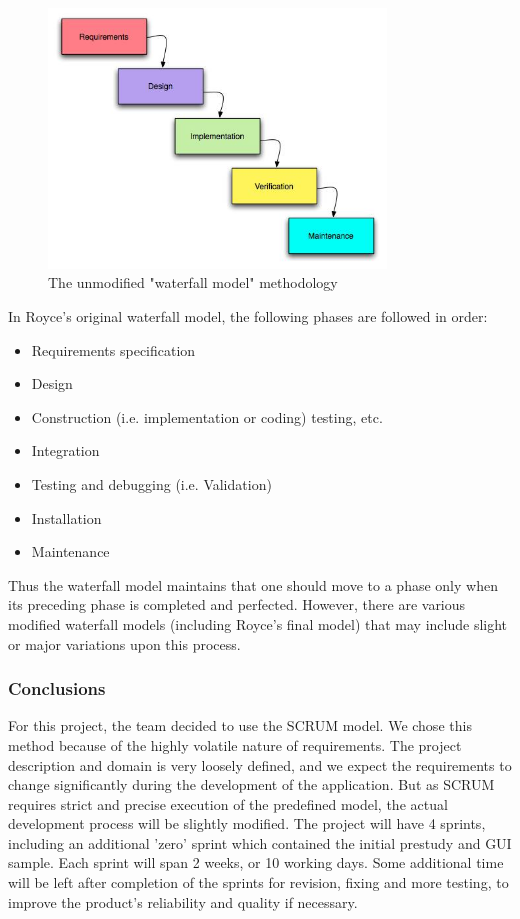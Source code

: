 \begin{figure}[htb]
	\centering
	\includegraphics[width=0.8\textwidth]{prestudy/development_process/waterfall.jpg}
	\caption{The unmodified "waterfall model" methodology\cite{worldpress:waterfall}}
	\label{fig:waterfall-model}
\end{figure}

In Royce's original waterfall model, the following phases are followed in order:

\begin{itemize}
	\item Requirements specification
	\item Design
	\item Construction (i.e. implementation or coding) testing, etc.
	\item Integration
	\item Testing and debugging (i.e. Validation)
	\item Installation
	\item Maintenance
\end{itemize}

Thus the waterfall model maintains that one should move to a phase only when its preceding phase is
completed and perfected. However, there are various modified waterfall models (including Royce's final model)
that may include slight or major variations upon this process.

\subsubsection{Conclusions}
For this project, the team decided to use the SCRUM model. We chose this method because of the highly volatile nature
of requirements. The project description and domain is very loosely defined,
and we expect the requirements to change significantly during the development
of the application. But as SCRUM requires strict and precise
execution of the predefined model, the actual development process will be slightly modified.
The project will have 4 sprints, including an additional 'zero' sprint which contained the initial
prestudy and GUI sample. Each sprint will span 2 weeks, or 10 working days.
Some additional time will be left after completion of the sprints for revision,
fixing and more testing, to improve the product's reliability and quality if necessary.
